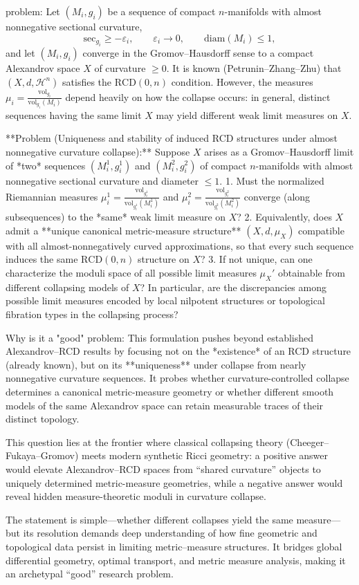problem:  
Let \((M_i, g_i)\) be a sequence of compact \(n\)-manifolds with almost nonnegative sectional curvature,  
\[
\mathrm{sec}_{g_i} \ge -\varepsilon_i, \qquad \varepsilon_i \to 0, \qquad \mathrm{diam}(M_i) \le 1,
\]
and let \((M_i, g_i)\) converge in the Gromov–Hausdorff sense to a compact Alexandrov space \(X\) of curvature \(\ge 0\).  It is known (Petrunin–Zhang–Zhu) that \((X, d, \mathcal{H}^n)\) satisfies the \(\mathrm{RCD}(0,n)\) condition.  
However, the measures \(\mu_i = \frac{\mathrm{vol}_{g_i}}{\mathrm{vol}_{g_i}(M_i)}\) depend heavily on how the collapse occurs: in general, distinct sequences having the same limit \(X\) may yield different weak limit measures on \(X\).  

**Problem (Uniqueness and stability of induced RCD structures under almost nonnegative curvature collapse):**  
Suppose \(X\) arises as a Gromov–Hausdorff limit of *two* sequences \((M_i^1,g_i^1)\) and \((M_i^2,g_i^2)\) of compact \(n\)-manifolds with almost nonnegative sectional curvature and diameter \(\le 1\).  
1. Must the normalized Riemannian measures \(\mu_i^1 = \frac{\mathrm{vol}_{g_i^1}}{\mathrm{vol}_{g_i^1}(M_i^1)}\) and \(\mu_i^2 = \frac{\mathrm{vol}_{g_i^2}}{\mathrm{vol}_{g_i^2}(M_i^2)}\) converge (along subsequences) to the *same* weak limit measure on \(X\)?  
2. Equivalently, does \(X\) admit a **unique canonical metric-measure structure** \((X,d,\mu_X)\) compatible with all almost-nonnegatively curved approximations, so that every such sequence induces the same \(\mathrm{RCD}(0,n)\) structure on \(X\)?  
3. If not unique, can one characterize the moduli space of all possible limit measures \(\mu_X'\) obtainable from different collapsing models of \(X\)?  
In particular, are the discrepancies among possible limit measures encoded by local nilpotent structures or topological fibration types in the collapsing process?

Why is it a "good" problem:  
This formulation pushes beyond established Alexandrov–RCD results by focusing not on the *existence* of an RCD structure (already known), but on its **uniqueness** under collapse from nearly nonnegative curvature sequences. It probes whether curvature-controlled collapse determines a canonical metric-measure geometry or whether different smooth models of the same Alexandrov space can retain measurable traces of their distinct topology.  

This question lies at the frontier where classical collapsing theory (Cheeger–Fukaya–Gromov) meets modern synthetic Ricci geometry: a positive answer would elevate Alexandrov–RCD spaces from “shared curvature” objects to uniquely determined metric-measure geometries, while a negative answer would reveal hidden measure-theoretic moduli in curvature collapse.  

The statement is simple—whether different collapses yield the same measure—but its resolution demands deep understanding of how fine geometric and topological data persist in limiting metric–measure structures. It bridges global differential geometry, optimal transport, and metric measure analysis, making it an archetypal “good” research problem.